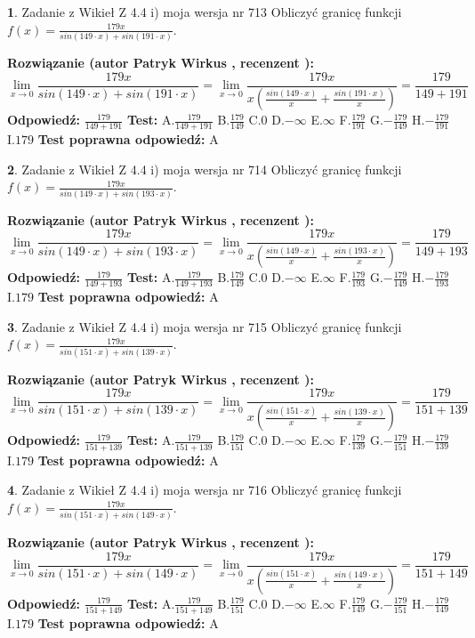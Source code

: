 \documentclass[12pt, a4paper]{article}
\theoremstyle{definition} %
\newtheorem{zad}{}
\newcommand{\zadStart}[1]{\begin{zad}#1\newline}
\newcommand{\zadStop}{\end{zad}}
\newcommand{\rozwStart}[2]{\noindent \textbf{Rozwiązanie (autor #1 , recenzent #2): }\newline}
\newcommand{\rozwStop}{\newline}
\newcommand{\odpStart}{\noindent \textbf{Odpowiedź:}\newline}
\newcommand{\odpStop}{\newline}
\newcommand{\testStart}{\noindent \textbf{Test:}\newline}
\newcommand{\testStop}{\newline}
\newcommand{\kluczStart}{\noindent \textbf{Test poprawna odpowiedź:}\newline}
\newcommand{\kluczStop}{\newline}
\begin{document}
\zadStart{Zadanie z Wikieł Z 4.4 i) moja wersja nr 713}
Obliczyć granicę funkcji $f(x)=\frac{179x}{sin(149\cdot x) +sin(191\cdot x)}$.
\zadStop
\rozwStart{Patryk Wirkus}{}
$$\lim\limits_{x\to 0}\frac{179x}{sin(149\cdot x) +sin(191\cdot x)}=\lim\limits_{x\to 0}\frac{179x}{x(\frac{sin(149\cdot x)}{x}+\frac{sin(191\cdot x)}{x})}=\frac{179}{149+191}$$
\rozwStop
\odpStart
$\frac{179}{149+191}$
\odpStop
\testStart
A.$\frac{179}{149+191}$
B.$\frac{179}{149}$
C.$0$
D.$-\infty$
E.$\infty$
F.$\frac{179}{191}$
G.$-\frac{179}{149}$
H.$-\frac{179}{191}$
I.$179$
\testStop
\kluczStart
A
\kluczStop



\zadStart{Zadanie z Wikieł Z 4.4 i) moja wersja nr 714}
Obliczyć granicę funkcji $f(x)=\frac{179x}{sin(149\cdot x) +sin(193\cdot x)}$.
\zadStop
\rozwStart{Patryk Wirkus}{}
$$\lim\limits_{x\to 0}\frac{179x}{sin(149\cdot x) +sin(193\cdot x)}=\lim\limits_{x\to 0}\frac{179x}{x(\frac{sin(149\cdot x)}{x}+\frac{sin(193\cdot x)}{x})}=\frac{179}{149+193}$$
\rozwStop
\odpStart
$\frac{179}{149+193}$
\odpStop
\testStart
A.$\frac{179}{149+193}$
B.$\frac{179}{149}$
C.$0$
D.$-\infty$
E.$\infty$
F.$\frac{179}{193}$
G.$-\frac{179}{149}$
H.$-\frac{179}{193}$
I.$179$
\testStop
\kluczStart
A
\kluczStop



\zadStart{Zadanie z Wikieł Z 4.4 i) moja wersja nr 715}
Obliczyć granicę funkcji $f(x)=\frac{179x}{sin(151\cdot x) +sin(139\cdot x)}$.
\zadStop
\rozwStart{Patryk Wirkus}{}
$$\lim\limits_{x\to 0}\frac{179x}{sin(151\cdot x) +sin(139\cdot x)}=\lim\limits_{x\to 0}\frac{179x}{x(\frac{sin(151\cdot x)}{x}+\frac{sin(139\cdot x)}{x})}=\frac{179}{151+139}$$
\rozwStop
\odpStart
$\frac{179}{151+139}$
\odpStop
\testStart
A.$\frac{179}{151+139}$
B.$\frac{179}{151}$
C.$0$
D.$-\infty$
E.$\infty$
F.$\frac{179}{139}$
G.$-\frac{179}{151}$
H.$-\frac{179}{139}$
I.$179$
\testStop
\kluczStart
A
\kluczStop



\zadStart{Zadanie z Wikieł Z 4.4 i) moja wersja nr 716}
Obliczyć granicę funkcji $f(x)=\frac{179x}{sin(151\cdot x) +sin(149\cdot x)}$.
\zadStop
\rozwStart{Patryk Wirkus}{}
$$\lim\limits_{x\to 0}\frac{179x}{sin(151\cdot x) +sin(149\cdot x)}=\lim\limits_{x\to 0}\frac{179x}{x(\frac{sin(151\cdot x)}{x}+\frac{sin(149\cdot x)}{x})}=\frac{179}{151+149}$$
\rozwStop
\odpStart
$\frac{179}{151+149}$
\odpStop
\testStart
A.$\frac{179}{151+149}$
B.$\frac{179}{151}$
C.$0$
D.$-\infty$
E.$\infty$
F.$\frac{179}{149}$
G.$-\frac{179}{151}$
H.$-\frac{179}{149}$
I.$179$
\testStop
\kluczStart
A
\kluczStop
\end{document}
